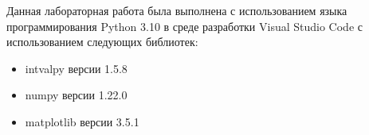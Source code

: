 Данная лабораторная работа была выполнена с использованием языка
программирования Python 3.10 в среде разработки Visual Studio Code с
использованием следующих библиотек:
\begin{itemize}
\item intvalpy версии 1.5.8
\item numpy версии 1.22.0
\item matplotlib версии 3.5.1
\end{itemize}
